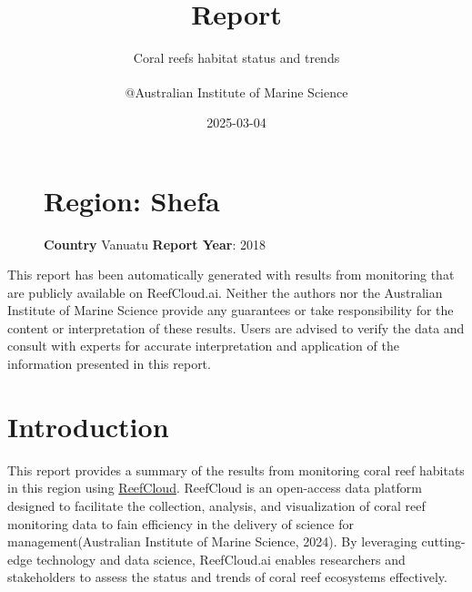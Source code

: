 \documentclass[
  letterpaper,
  DIV=11,
  numbers=noendperiod]{scrartcl}
\title{Report}
\subtitle{Coral reefs habitat status and trends}
\author{@Australian Institute of Marine Science\textsuperscript{}}
\date{2025-03-04}
\makeatletter
\newcommand*\pandocbounded[1]{%
  \sbox\pandoc@box{#1}%
  \Gscale@div\@tempa{\textheight}{\dimexpr\ht\pandoc@box+\dp\pandoc@box\relax}%
  \Gscale@div\@tempb{\linewidth}{\wd\pandoc@box}%
  \ifdim\@tempb\p@<\@tempa\p@\let\@tempa\@tempb\fi%
  \ifdim\@tempa\p@<\p@\scalebox{\@tempa}{\usebox\pandoc@box}%
  \else\usebox{\pandoc@box}%
  \fi%
}
\renewcommand{\maketitle}{\bgroup\setlength{\parindent}{0pt}
\begin{flushleft}
  {\sffamily\huge\textbf{\MakeUppercase{\@title}}} \vspace{0.3cm} \newline
  {\Large {\@subtitle}} \newline
  {\@author} \newline
  \@date
\end{flushleft}\egroup
}
\makeatother
\begin{document}
\maketitle

\pagestyle{mystyle}


\begin{figure}

\begin{minipage}{0.60\linewidth}
\pandocbounded{\texttt{[image: figures/Region\_Map.png]}}\hfill
\end{minipage}%
%
\begin{minipage}{0.40\linewidth}

\section{Region: Shefa}\label{region-shefa}

\textbf{Country} Vanuatu \textbf{Report Year}: 2018\end{minipage}%

\end{figure}%

\begin{tcolorbox}[enhanced jigsaw, toprule=.15mm, breakable, rightrule=.15mm, bottomtitle=1mm, colframe=quarto-callout-note-color-frame, colbacktitle=quarto-callout-note-color!10!white, coltitle=black, opacityback=0, arc=.35mm, leftrule=.75mm, title=\textcolor{quarto-callout-note-color}{\faInfo}\hspace{0.5em}{Disclaimer}, toptitle=1mm, opacitybacktitle=0.6, titlerule=0mm, colback=white, left=2mm, bottomrule=.15mm]

This report has been automatically generated with results from
monitoring that are publicly available on ReefCloud.ai. Neither the
authors nor the Australian Institute of Marine Science provide any
guarantees or take responsibility for the content or interpretation of
these results. Users are advised to verify the data and consult with
experts for accurate interpretation and application of the information
presented in this report.

\end{tcolorbox}

\newpage

\section{Introduction}\label{introduction}

This report provides a summary of the results from monitoring coral reef
habitats in this region using \href{www.reefcloud.ai}{ReefCloud}.
ReefCloud is an open-access data platform designed to facilitate the
collection, analysis, and visualization of coral reef monitoring data to
fain efficiency in the delivery of science for management(Australian
Institute of Marine Science, 2024). By leveraging cutting-edge
technology and data science, ReefCloud.ai enables researchers and
stakeholders to assess the status and trends of coral reef ecosystems
effectively.
\end{document}

